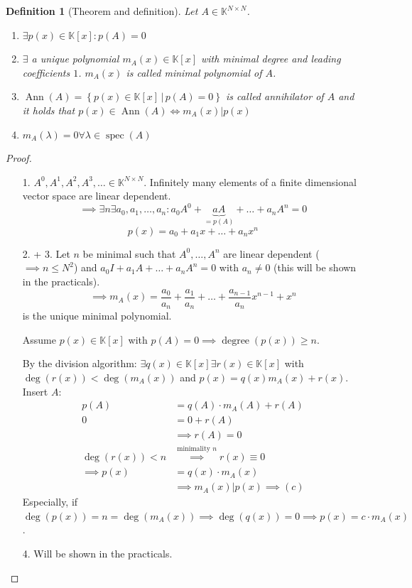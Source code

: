\documentclass{article}
\newtheorem{definition}{Definition}  \numberwithin{definition}{section}
\newcommand{\setdef}[2]{\left\{\left.#1\,\right|\,#2\right\}}
\begin{document}
\begin{definition}[Theorem and definition] %
  Let $A \in \mathbb K^{N \times N}$.
  \begin{enumerate}
    \item $\exists p(x) \in \mathbb K[x]: p(A) = 0$
    \item $\exists$ a unique polynomial $m_A(x) \in \mathbb K[x]$ with minimal degree and leading coefficients $1$.
      $m_A(x)$ is called \emph{minimal polynomial of $A$}.
    \item $\operatorname{Ann}(A) = \setdef{p(x) \in \mathbb K[x]}{p(A) = 0}$ is called \emph{annihilator of $A$}
      and it holds that $p(x) \in \operatorname{Ann}(A) \iff m_A(x) | p(x)$
    \item $m_A(\lambda) = 0 \forall \lambda \in \operatorname{spec}(A)$
  \end{enumerate}
\end{definition}

\begin{proof}
  \begin{enumerate}
    \item[1.] $A^0, A^1, A^2, A^3, \dots \in \mathbb K^{N \times N}$.
      Infinitely many elements of a finite dimensional vector space are linear dependent.
      \[ \implies \exists n \exists a_0, a_1, \dots, a_n: a_0 A^0 + \underbrace{a A}_{= p(A)} + \dots + a_n A^n = 0 \]
      \[ p(x) = a_0 + a_1 x + \dots + a_n x^n \]
    \item[2. + 3.]
      Let $n$ be minimal such that $A^0, \dots, A^n$ are linear dependent ($\implies n \leq N^2$) and $a_0 I + a_1 A + \dots + a_n A^n = 0$ with $a_n \neq 0$ (this will be shown in the practicals).
      \[ \implies m_A(x) = \frac{a_0}{a_n} + \frac{a_1}{a_n} + \dots + \frac{a_{n-1}}{a_n} x^{n-1} + x^n \]
      is the unique minimal polynomial.

      Assume $p(x) \in \mathbb K[x]$ with $p(A) = 0 \implies \operatorname{degree}(p(x)) \geq n$.

      By the division algorithm: $\exists q(x) \in \mathbb K[x] \exists r(x) \in \mathbb K[x]$ with $\deg(r(x)) < \deg(m_A(x))$ and $p(x) = q(x) m_A(x) + r(x)$. Insert $A$:
      \begin{align*}
        p(A) &= q(A) \cdot m_A(A) + r(A) \\
        0 &= 0 + r(A) \\
        & \implies r(A) = 0 \\
        \deg(r(x)) < n & \overset{\text{minimality $n$}}\implies r(x) \equiv 0 \\
        \implies p(x) &= q(x) \cdot m_A(x) \\
          & \implies m_A(x) | p(x) \implies (c)
      \end{align*}
      Especially, if $\deg(p(x)) = n = \deg(m_A(x)) \implies \deg(q(x)) = 0 \implies p(x) = c \cdot m_A(x)$.
    \item[4.] Will be shown in the practicals.
  \end{enumerate}
\end{proof}
\end{document}
